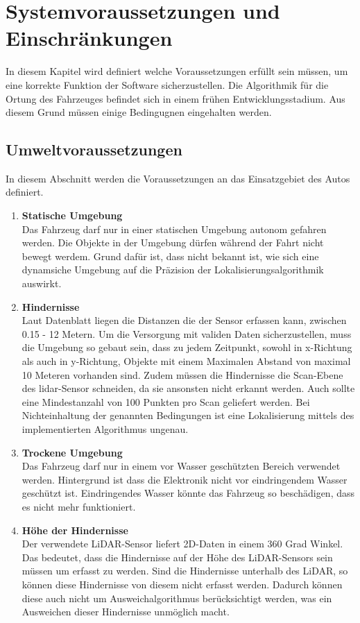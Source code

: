 \section{Systemvoraussetzungen und Ein\-schränkungen}
\label{umwelt}
In diesem Kapitel wird definiert welche Voraussetzungen erfüllt sein müssen, um eine korrekte Funktion der Software sicherzustellen.
Die Algorithmik für die Ortung des Fahrzeuges befindet sich in einem frühen Entwicklungsstadium. 
Aus diesem Grund müssen einige Bedingugnen eingehalten werden. 

\subsection{Umweltvoraussetzungen}
In diesem Abschnitt werden die Voraussetzungen an das Einsatzgebiet des Autos definiert.

\begin{enumerate}[leftmargin=*]
    \item \textbf{Statische Umgebung} \\
    Das Fahrzeug darf nur in einer statischen Umgebung autonom gefahren werden. 
    Die Objekte in der Umgebung dürfen während der Fahrt nicht bewegt werdem.
    Grund dafür ist, dass nicht bekannt ist, wie sich eine dynamsiche Umgebung auf die Präzision der Lokalisierungsalgorithmik auswirkt. 
    
    \item \textbf{Hindernisse} \\
    Laut Datenblatt \cite{Slamtec2020} liegen die Distanzen die der Sensor erfassen kann, zwischen 0.15 - 12 Metern.
    Um die Versorgung mit validen Daten sicherzustellen, muss die Umgebung so gebaut sein, 
    dass zu jedem Zeitpunkt, sowohl in x-Richtung als auch in y-Richtung, Objekte mit einem Maximalen Abstand von maximal 10 Meteren vorhanden sind.
    Zudem müssen die Hindernisse die Scan-Ebene des \ac{lidar}-Sensor schneiden, da sie ansonsten nicht erkannt werden.
    Auch sollte eine Mindestanzahl von 100 Punkten pro Scan geliefert werden.
    Bei Nichteinhaltung der genannten Bedingungen ist eine Lokalisierung mittels des implementierten Algorithmus ungenau.
    
    \item \textbf{Trockene Umgebung} \\
    Das Fahrzeug darf nur in einem vor Wasser geschützten Bereich verwendet werden.
    Hintergrund ist dass die Elektronik nicht vor eindringendem Wasser geschützt ist.
    Eindringendes Wasser könnte das Fahrzeug so beschädigen, dass es nicht mehr funktioniert.
   
    \item \textbf{Höhe der Hindernisse} \\
    Der verwendete LiDAR-Sensor liefert 2D-Daten in einem 360 Grad Winkel. 
    Das bedeutet, dass die Hindernisse auf der Höhe des LiDAR-Sensors sein müssen um erfasst zu werden.
    Sind die Hindernisse unterhalb des LiDAR, so können diese Hindernisse von diesem nicht erfasst werden.
    Dadurch können diese auch nicht um Ausweichalgorithmus berücksichtigt werden, was ein Ausweichen dieser Hindernisse unmöglich macht.
\end{enumerate}

